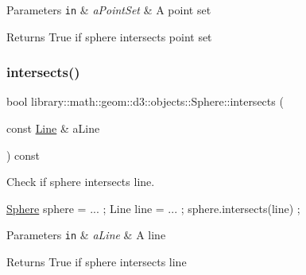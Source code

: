 \begin{DoxyParams}[1]{Parameters}
\mbox{\tt in}  & {\em a\+Point\+Set} & A point set \\
\hline
\end{DoxyParams}
\begin{DoxyReturn}{Returns}
True if sphere intersects point set 
\end{DoxyReturn}
\mbox{\label{classlibrary_1_1math_1_1geom_1_1d3_1_1objects_1_1_sphere_a3740a954ea02ce23ff121a92f8902d92}} 
\subsubsection{\texorpdfstring{intersects()}{intersects()}\hspace{0.1cm}{\footnotesize\ttfamily [3/8]}}
{\footnotesize\ttfamily bool library\+::math\+::geom\+::d3\+::objects\+::\+Sphere\+::intersects (\begin{DoxyParamCaption}\item[{const \hyperlink{classlibrary_1_1math_1_1geom_1_1d3_1_1objects_1_1_line}{Line} \&}]{a\+Line }\end{DoxyParamCaption}) const}



Check if sphere intersects line. 


\begin{DoxyCode}
\hyperlink{classlibrary_1_1math_1_1geom_1_1d3_1_1objects_1_1_sphere_a55dccc8ea16ee55cd7694c26afa8ea39}{Sphere} sphere = ... ;
Line line = ... ;
sphere.intersects(line) ;
\end{DoxyCode}



\begin{DoxyParams}[1]{Parameters}
\mbox{\tt in}  & {\em a\+Line} & A line \\
\hline
\end{DoxyParams}
\begin{DoxyReturn}{Returns}
True if sphere intersects line 
\end{DoxyReturn}
\mbox{\label{classlibrary_1_1math_1_1geom_1_1d3_1_1objects_1_1_sphere_a726c504380238289eb3a2faf80f3d472}} 
